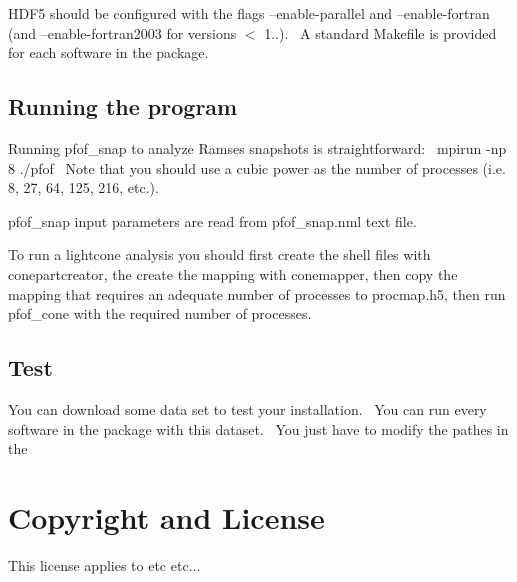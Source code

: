  H\+D\+F5 should be configured with the flags --enable-\/parallel and --enable-\/fortran (and --enable-\/fortran2003 for versions $<$ 1..).~\newline
 A standard Makefile is provided for each software in the package.\hypertarget{index_running}{}\subsection{Running the program}\label{index_running}
Running pfof\+\_\+snap to analyze Ramses snapshots is straightforward\+:~\newline
 mpirun -\/np 8 ./pfof~\newline
 Note that you should use a cubic power as the number of processes (i.\+e. 8, 27, 64, 125, 216, etc.).~\newline


pfof\+\_\+snap input parameters are read from pfof\+\_\+snap.\+nml text file.~\newline


To run a lightcone analysis you should first create the shell files with conepartcreator, the create the mapping with conemapper, then copy the mapping that requires an adequate number of processes to procmap.\+h5, then run pfof\+\_\+cone with the required number of processes.\hypertarget{index_test_sec}{}\subsection{Test}\label{index_test_sec}
You can download some data set to test your installation.~\newline
 You can run every software in the package with this dataset.~\newline
 You just have to modify the pathes in the ~\newline
\hypertarget{index_copyright}{}\section{Copyright and License}\label{index_copyright}
This license applies to etc etc...

~\newline
~\newline
 